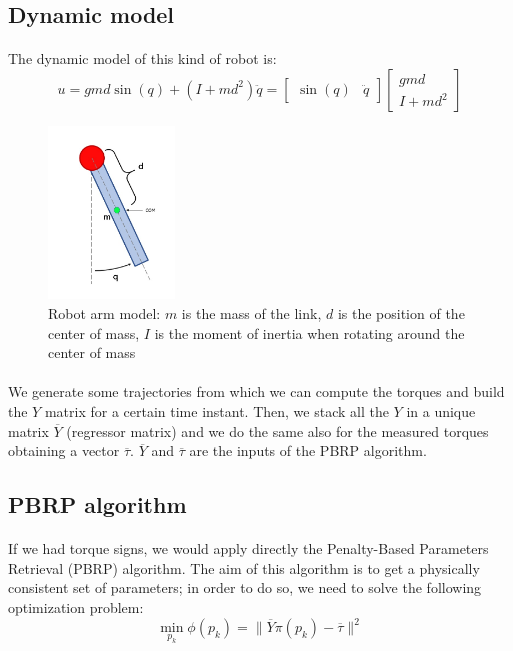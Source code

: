 \documentclass{article}
\begin{document}
\subsection{Dynamic model}
\paragraph{} 
The dynamic model of this kind of robot is:
\[u=gmd \sin(q) + (I+md^2)\ddot{q}= \begin{bmatrix}
\sin(q) & \ddot{q}
\end{bmatrix}\begin{bmatrix}
gmd \\ I +md^2
\end{bmatrix}\]
\begin{figure}[!htbp]
\centering
\includegraphics[width=0.3\textwidth]{images/1-dof/model.jpeg}
\caption{Robot arm model: $m$ is the mass of the link, $d$ is the position of the center of mass, $I$ is the moment of inertia when rotating around the center of mass}
\end{figure}
\FloatBarrier

\paragraph{} We generate some trajectories from which we can compute the torques and build the $Y$ matrix for a certain time instant. Then, we stack all the $Y$ in a unique matrix $\overline{Y}$ (regressor matrix) and we do the same also for the measured torques obtaining a vector $\overline{\tau}$. $\overline{Y}$ and $\overline{\tau}$ are the inputs of the PBRP algorithm.

\subsection{PBRP algorithm}
\paragraph{}If we had torque signs, we would apply directly the Penalty-Based Parameters Retrieval (PBRP) algorithm. The aim of this algorithm is to get a physically consistent set of parameters; in order to do so, we need to solve the following optimization problem:
\[\min_{p_k}{\phi(p_k)} = \lVert \overline{Y}\pi(p_k)-\overline{\tau} \rVert^2\]
\end{document}
